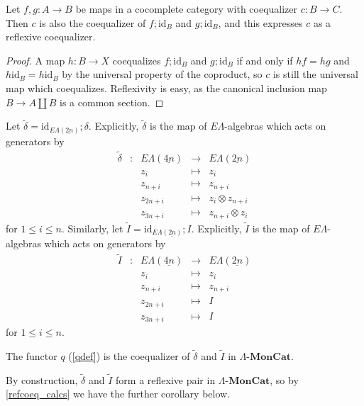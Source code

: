 \documentclass{amsbook} %
\newcommand{\mb}{\mathbf}
\newcommand{\id}{\textrm{id}}
\newcommand{\ELAlg}{\lmc}
\newcommand{\ELnn}{E\Lambda(\underline{2n})}
\newcommand{\ELnnnn}{E\Lambda(\underline{4n})}
\newcommand{\lmc}{\Lambda\mbox{-}\mb{MonCat}}
\numberwithin{section}{chapter}
\begin{document}
\begin{lem}\label{sum_coeq}
Let $f, g \colon  A \to B$ be maps in a cocomplete category with coequalizer $c \colon  B \to C$. Then $c$ is also the coequalizer of $f;\id_B$ and $g; \id_B$, and this expresses $c$ as a reflexive coequalizer.
\end{lem}
\begin{proof}
A map $h \colon  B \to X$ coequalizes $f;\id_B$ and $g; \id_B$ if and only if $hf = hg$ and $h \id_B = h \id_B$ by the universal property of the coproduct, so $c$ is still the universal map which coequalizes. Reflexivity is easy, as the canonical inclusion map $B \to A \coprod B$ is a common section.

\end{proof}

\begin{Defi} \label{coprodmapdef} Let $\tilde{\delta} = \id_{\ELnn};\delta$.
Explicitly, $\tilde{\delta}$ is the map of $E\Lambda$-algebras which acts on generators by
\[ \begin{array}{rlrlll}
			\tilde{\delta} & \colon & \ELnnnn & \to & \ELnn \\
			&  & z_i & \mapsto & z_i  \\
			&  & z_{n+i} & \mapsto & z_{n+i} \\
			&  & z_{2n+i} & \mapsto & z_i \otimes z_{n+i} \\
			&  & z_{3n+i} & \mapsto & z_{n+i} \otimes z_i			
		\end{array}
\]
for $1 \le i \le n$. Similarly, let $\tilde{I} = \id_{\ELnn};I$.
Explicitly, $\tilde{I}$ is the map of $E\Lambda$-algebras which acts on generators by
\[ \begin{array}{rlrlll}
			\tilde{I} & \colon & \ELnnnn & \to & \ELnn \\
			&  & z_i & \mapsto & z_i  \\
			& & z_{n+i} & \mapsto & z_{n+i} \\
			& & z_{2n+i} & \mapsto & I \\
			&  & z_{3n+i} & \mapsto & I
		\end{array} 
\]
for $1 \le i \le n$. 
\end{Defi}



\begin{cor}\label{q_other_coeq} The functor $q$ (\cref{qdef}) is the coequalizer of $\tilde{\delta}$ and $\tilde{I}$ in $\ELAlg$.
\end{cor}

By construction, $\tilde{\delta}$ and $\tilde{I}$ form a reflexive pair in $\ELAlg$, so by \cref{refcoeq_calcs} we have the further corollary below.
\end{document}
